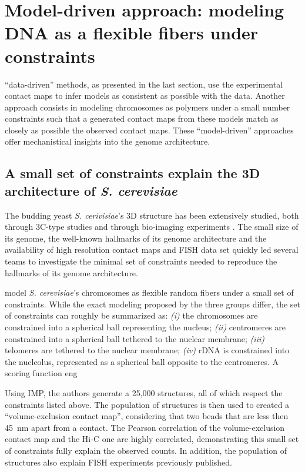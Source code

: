 \documentclass[letterpaper,12pt]{article}
\begin{document}
\section*{Model-driven approach: modeling DNA as a flexible fibers under constraints}

``data-driven'' methods, as presented in the last section, use the
experimental contact maps to infer models as consistent as possible with the
data. Another approach consists in modeling chromosomes as polymers under a
small number constraints such that a generated contact maps from these models
match as closely as possible the observed contact maps. These ``model-driven''
approaches offer mechanistical insights into the genome architecture.


\subsection*{A small set of constraints explain the 3D architecture of \textit{S. cerevisiae}}

The budding yeast \textit{S. cerivisiae}'s 3D structure has been extensively
studied, both through 3C-type studies \citep{dekker:capturing,
duan:three-dimensional, burton:species-level} and through bio-imaging experiments
\citep{berger:high}. The small size of its genome, the well-known hallmarks of its
genome architecture and the availability of high resolution contact maps and
FISH data set quickly led several teams to investigate the minimal set of
constraints needed to reproduce the hallmarks of its genome architecture.

\cite{tjong:physical, tokuda:dynamical, tjong:physical} model {\em S.
cerevisiae}'s chromosomes as flexible random fibers under a small set of
constraints. While the exact modeling proposed by the three groups differ, the
set of constraints can roughly be summarized as: \textit{(i)} the chromosomes
are constrained into a spherical ball representing the nucleus; \textit{(ii)}
centromeres are constrained into a spherical ball tethered to the nuclear
membrane; \textit{(iii)} telomeres are tethered to the nuclear membrane;
\textit{(iv)} rDNA is constrained into the nucleolus, represented as a
spherical ball opposite to the centromeres. A scoring function eng


Using IMP, the authors generate a 25,000 structures, all of which respect the
constraints listed above. The population of structures is then used to created
a ``volume-exclusion contact map'', considering that two beads that are less
then 45~nm apart from a contact. The Pearson correlation of the
volume-exclusion contact map and the Hi-C one are highly correlated,
demonstrating this small set of constraints fully explain the observed counts.
In addition, the population of structures also explain FISH experiments
previously published.
\end{document}
